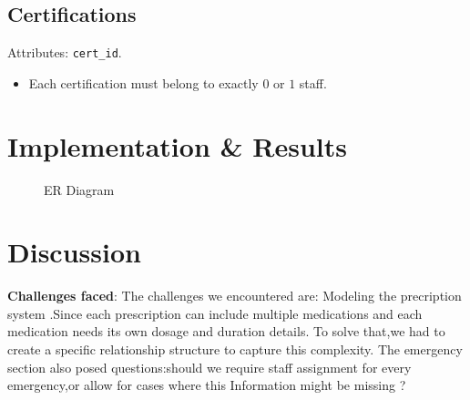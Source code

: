 \documentclass[a4paper,12pt]{article}
\begin{document}
\subsection*{Certifications}
Attributes: \texttt{cert\_id}.
\begin{itemize}
    \item Each certification must belong to exactly $0$ or $1$ staff.
\end{itemize}
\section{Implementation \& Results}
\begin{figure}[htbp]
    \caption{ER Diagram}
    \label{fig:ERD}
\end{figure}

\newpage


\section{Discussion}
\textbf{Challenges faced}:
The challenges we encountered are:
Modeling the precription system .Since each prescription
can include multiple medications and each medication needs its own dosage and duration details.
To solve that,we had to create a specific relationship structure to capture this complexity.
The emergency section also posed questions:should we require staff assignment for every emergency,or allow for cases where this Information
might be missing ?
\end{document}
